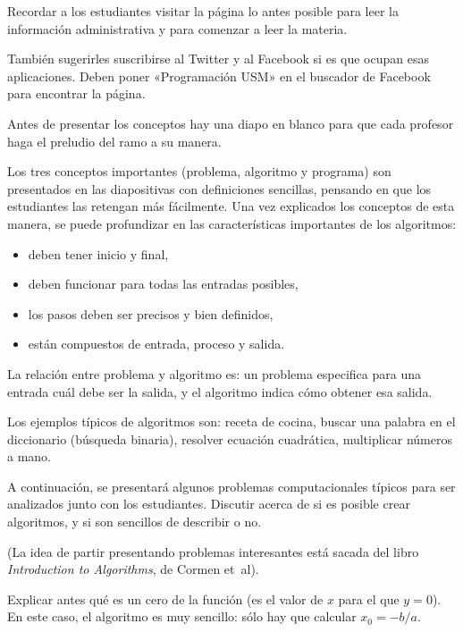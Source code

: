 \documentclass[10pt]{article}
\begin{document}

  Recordar a los estudiantes
  visitar la página lo antes posible
  para leer la información administrativa
  y para comenzar a leer la materia.
  
  También sugerirles suscribirse al Twitter y al Facebook
  si es que ocupan esas aplicaciones.
  Deben poner «Programación USM» en el buscador de Facebook
  para encontrar la página.


  Antes de presentar los conceptos hay una diapo en blanco
  para que cada profesor haga el preludio del ramo a su manera.

  Los tres conceptos importantes (problema, algoritmo y programa)
  son presentados en las diapositivas con definiciones sencillas,
  pensando en que los estudiantes las retengan más fácilmente.
  Una vez explicados los conceptos de esta manera,
  se puede profundizar en las características importantes de los algoritmos:
  \begin{itemize}
    \item deben tener inicio y final,
    \item deben funcionar para todas las entradas posibles,
    \item los pasos deben ser precisos y bien definidos,
    \item están compuestos de entrada, proceso y salida.
  \end{itemize}

  La relación entre problema y algoritmo es:
  un problema especifica para una entrada cuál debe ser la salida,
  y el algoritmo indica cómo obtener esa salida.

  Los ejemplos típicos de algoritmos son:
  receta de cocina,
  buscar una palabra en el diccionario (búsqueda binaria),
  resolver ecuación cuadrática,
  multiplicar números a mano.
  \newpage

  A continuación,
  se presentará algunos problemas computacionales típicos
  para ser analizados junto con los estudiantes.
  Discutir acerca de si es posible crear algoritmos,
  y si son sencillos de describir o no.

  (La idea de partir presentando problemas interesantes
  está sacada del libro \emph{Introduction to Algorithms},
  de Cormen et~al).
 

  Explicar antes qué es un cero de la función
  (es el valor de \(x\) para el que \(y = 0\)).
  En este caso, el algoritmo es muy sencillo:
  sólo hay que calcular \(x_0 = -b/a\).
  
\end{document}
